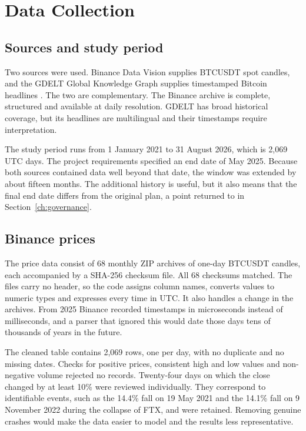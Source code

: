 \section{Data Collection}
\label{ch:data}
\subsection{Sources and study period}
Two sources were used. Binance Data Vision supplies BTCUSDT spot candles, and the GDELT Global Knowledge Graph supplies timestamped Bitcoin headlines \cite{binancepublic,leetaru2013,gdeltdata}. The two are complementary. The Binance archive is complete, structured and available at daily resolution. GDELT has broad historical coverage, but its headlines are multilingual and their timestamps require interpretation.

The study period runs from 1 January 2021 to 31 August 2026, which is 2,069 UTC days. The project requirements specified an end date of May 2025. Because both sources contained data well beyond that date, the window was extended by about fifteen months. The additional history is useful, but it also means that the final end date differs from the original plan, a point returned to in Section~\ref{ch:governance}.

\subsection{Binance prices}
The price data consist of 68 monthly ZIP archives of one-day BTCUSDT candles, each accompanied by a SHA-256 checksum file. All 68 checksums matched. The files carry no header, so the code assigns column names, converts values to numeric types and expresses every time in UTC. It also handles a change in the archives. From 2025 Binance recorded timestamps in microseconds instead of milliseconds, and a parser that ignored this would date those days tens of thousands of years in the future.

The cleaned table contains 2,069 rows, one per day, with no duplicate and no missing dates. Checks for positive prices, consistent high and low values and non-negative volume rejected no records. Twenty-four days on which the close changed by at least 10\% were reviewed individually. They correspond to identifiable events, such as the 14.4\% fall on 19 May 2021 and the 14.1\% fall on 9 November 2022 during the collapse of FTX, and were retained. Removing genuine crashes would make the data easier to model and the results less representative.

